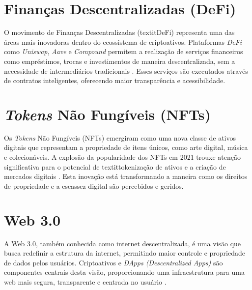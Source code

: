 \section*{Finanças Descentralizadas (DeFi)}

O movimento de Finanças Descentralizadas (textit{DeFi}) representa uma das áreas mais inovadoras dentro do ecossistema de criptoativos. Plataformas \textit{DeFi} como \textit{Uniswap}, \textit{Aave} e \textit{Compound} permitem a realização de serviços financeiros como empréstimos, trocas e investimentos de maneira descentralizada, sem a necessidade de intermediários tradicionais \cite{zhang2020data}. Esses serviços são executados através de contratos inteligentes, oferecendo maior transparência e acessibilidade.

\section*{\textit{Tokens} Não Fungíveis (NFTs)}

Os \textit{Tokens} Não Fungíveis (NFTs) emergiram como uma nova classe de ativos digitais que representam a propriedade de itens únicos, como arte digital, música e colecionáveis. A explosão da popularidade dos NFTs em 2021 trouxe atenção significativa para o potencial de textit{tokenização} de ativos e a criação de mercados digitais \cite{wang2021non}. Esta inovação está transformando a maneira como os direitos de propriedade e a escassez digital são percebidos e geridos.

\section*{Web 3.0}

A Web 3.0, também conhecida como internet descentralizada, é uma visão que busca redefinir a estrutura da internet, permitindo maior controle e propriedade de dados pelos usuários. Criptoativos e \textit{DApps (Descentralized Apps)} são componentes centrais desta visão, proporcionando uma infraestrutura para uma web mais segura, transparente e centrada no usuário \cite{zhang2019secure}.

